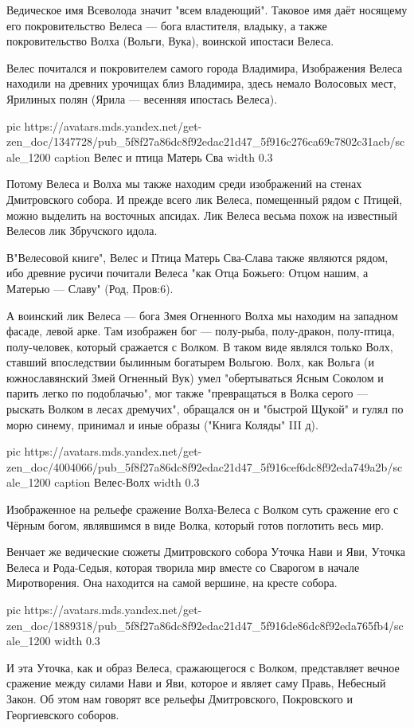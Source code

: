 Ведическое имя Всеволода значит "всем владеющий". Таковое имя даёт носящему его
покровительство Велеса — бога властителя, владыку, а также покровительство
Волха (Вольги, Вука), воинской ипостаси Велеса.

Велес почитался и покровителем самого города Владимира, Изображения Велеса
находили на древних урочищах близ Владимира, здесь немало Волосовых мест,
Ярилиных полян (Ярила — весенняя ипостась Велеса).


\ifcmt
  pic https://avatars.mds.yandex.net/get-zen_doc/1347728/pub_5f8f27a86dc8f92edac21d47_5f916c276ca69c7802c31acb/scale_1200
  caption Велес и птица Матерь Сва
  width 0.3
\fi

Потому Велеса и Волха мы также находим среди изображений на стенах Дмитровского
собора. И прежде всего лик Велеса, помещенный рядом с Птицей, можно выделить на
восточных апсидах. Лик Велеса весьма похож на известный Велесов лик Збручского
идола.

В"Велесовой книге", Велес и Птица Матерь Сва-Слава также являются рядом, ибо
древние русичи почитали Велеса "как Отца Божьего: Отцом нашим, а Матерью —
Славу" (Род, Пров:6).

А воинский лик Велеса — бога Змея Огненного Волха мы находим на западном
фасаде, левой арке. Там изображен бог — полу-рыба, полу-дракон, полу-птица,
полу-человек, который сражается с Волком. В таком виде являлся только Волх,
ставший впоследствии былинным богатырем Вольгою. Волх, как Вольга (и
южнославянский Змей Огненный Вук) умел "обертываться Ясным Соколом и парить
легко по подоблачью", мог также "превращаться в Волка серого — рыскать Волком в
лесах дремучих", обращался он и "быстрой Щукой" и гулял по морю синему,
принимал и иные образы ("Книга Коляды" III д).


\ifcmt
  pic https://avatars.mds.yandex.net/get-zen_doc/4004066/pub_5f8f27a86dc8f92edac21d47_5f916cef6dc8f92eda749a2b/scale_1200
  caption Велес-Волх
  width 0.3
\fi

Изображенное на рельефе сражение Волха-Велеса с Волком суть сражение его с
Чёрным богом, являвшимся в виде Волка, который готов поглотить весь мир.

Венчает же ведические сюжеты Дмитровского собора Уточка Нави и Яви, Уточка
Велеса и Рода-Седыя, которая творила мир вместе со Сварогом в начале
Миротворения. Она находится на самой вершине, на кресте собора.

\ifcmt
  pic https://avatars.mds.yandex.net/get-zen_doc/1889318/pub_5f8f27a86dc8f92edac21d47_5f916de86dc8f92eda765fb4/scale_1200
  width 0.3
\fi

И эта Уточка, как и образ Велеса, сражающегося с Волком, представляет вечное
сражение между силами Нави и Яви, которое и являет саму Правь, Небесный Закон.
Об этом нам говорят все рельефы Дмитровского, Покровского и Георгиевского
соборов.



